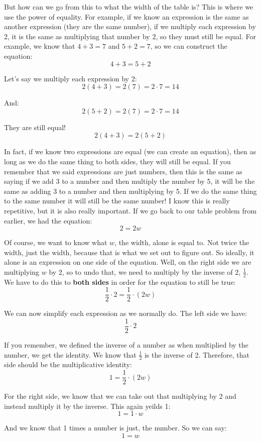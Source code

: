 \documentclass{article}
\begin{document}
But how can we go from this to what the width of the table is? This is where we use the power of equality. For example, if we know an expression is the same as another expression (they are the same number), if we multiply each expression by 2, it is the same as multiplying that number by 2, so they must still be equal. For example, we know that $4+3=7$ and $5+2=7$, so we can construct the equation:
\[ 4+3 = 5+2 \]

Let's say we multiply each expression by 2: 
\[ 2(4+3) = 2(7) = 2 \cdot 7 = 14 \]

And: 
\[ 2(5+2) = 2(7) = 2 \cdot 7 = 14 \]

They are still equal! 
\[ 2(4+3) = 2(5+2) \]

In fact, if we know two expressions are equal (we can create an equation), then as long as we do the same thing to both sides, they will still be equal. If you remember that we said expressions are just numbers, then this is the same as saying if we add 3 to a number and then multiply the number by 5, it will be the same as adding 3 to a number and then multiplying by 5. 
If we do the same thing to the same number it will still be the same number! I know this is really repetitive, but it is also really important. If we go back to our table problem from earlier, we had the equation: 
\[ 2 = 2w \]

Of course, we want to know what $w$, the width, alone is equal to. Not twice the width, just the width, because that is what we set out to figure out. So ideally, it alone is an expression on one side of the equation. Well, on the right side we are multiplying $w$ by 2, so to undo that, we need to multiply by the inverse of 2, $\frac{1}{2}$. We have to do this to \textbf{both sides} in order for the equation to still be true: 
\[ \frac{1}{2} \cdot 2 = \frac{1}{2} \cdot (2w) \]

We can now simplify each expression as we normally do. The left side we have: 
\[ \frac{1}{2} \cdot 2 \]

If you remember, we defined the inverse of a number as when multiplied by the number, we get the identity. We know that $\frac{1}{2}$ is the inverse of 2. Therefore, that side should be the multiplicative identity: 
\[ 1 = \frac{1}{2} \cdot (2w) \]

For the right side, we know that we can take out that multiplying by 2 and instead multiply it by the inverse. This again yeilds 1: 
\[ 1 = 1 \cdot w \]

And we know that 1 times a number is just, the number. So we can say: 
\[ 1 = w \]
\end{document}
